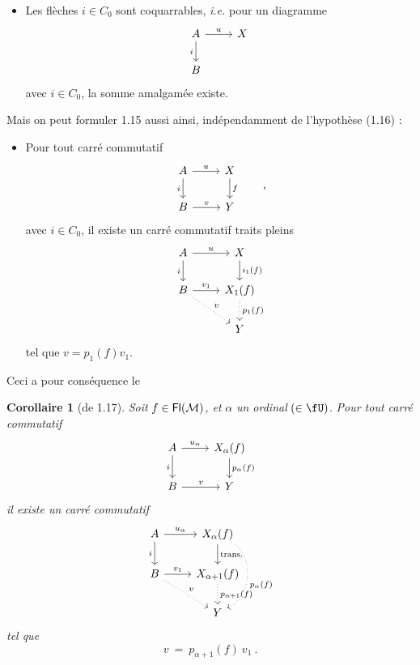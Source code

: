 \begin{itemize}[leftmargin=5em, labelwidth=4em, labelsep=1em, align=left]
\item[(1.16)] Les flèches $i \in C_0$ sont coquarrables, \textit{i.e.} pour un diagramme
\[
\begin{tikzcd}
A \arrow[r, "u"] \arrow[d, "i"'] & X \\
B &
\end{tikzcd}
\]
avec $i \in C_0$, la somme amalgamée existe.
\end{itemize}

Mais on peut formuler 1.15 aussi ainsi, indépendamment de l'hypothèse (1.16) :

\begin{itemize}[leftmargin=5em, labelwidth=4em, labelsep=1em, align=left]
\item[(1.17)] Pour tout carré commutatif
\[
\begin{tikzcd}
A \arrow[r, "u"] \arrow[d, "i"'] & X \arrow[d, "f"] \\
B \arrow[r, "v"] & Y
\end{tikzcd}
\qquad ,
\]
avec $i \in C_0$, il existe un carré commutatif traits pleins
\[
\begin{tikzcd}
A \arrow[r, "u"] \arrow[d, "i"'] & X \arrow[d, "i_1(f)"] \\
B \arrow[r, "v_1"] \arrow[dr, dotted, "v"] & X_1(f) \arrow[d, dotted, "p_1(f)"] \\
 & Y
\end{tikzcd}
\]
tel que $v = p_1(f)v_1$.
\end{itemize}

Ceci a pour conséquence le

\textbf{Corollaire 1} (de 1.17). \textit{Soit} $f \in \mathsf{Fl}(\mathcal{M})$\textit{, et} $\alpha$ \textit{un ordinal} $(\in \fU)$. \textit{Pour tout carré commutatif}
\[
\begin{tikzcd}
A \arrow[r, "u_\alpha"] \arrow[d, "i"'] & X_\alpha(f) \arrow[d, "p_\alpha(f)"] \\
B \arrow[r, "v"] & Y
\end{tikzcd}
\]
\textit{il existe un carré commutatif}
\[
\begin{tikzcd}
A \arrow[r, "u_\alpha"] \arrow[d, "i"'] & X_\alpha(f) \arrow[d, "\text{trans.}"] \arrow[dd, dotted, bend left=60, "p_\alpha(f)"] \\
B \arrow[r, "v_1"] \arrow[dr, dotted, "v"] & X_{\alpha+1}(f) \arrow[d, dotted, "p_{\alpha+1}(f)"] \\
 & Y
\end{tikzcd}
\]
\textit{tel que}
\[
v \ = \ p_{\alpha+1}(f)\ v_1 \ .
\]

